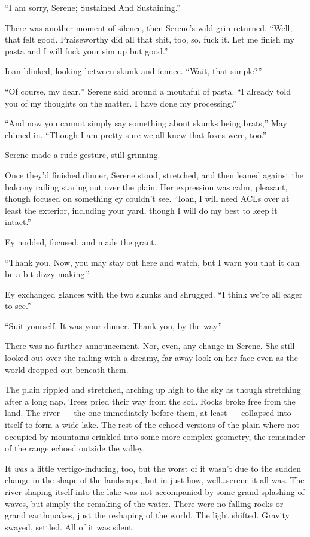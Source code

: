 ``I am sorry, Serene; Sustained And Sustaining.''

There was another moment of silence, then Serene's wild grin returned. ``Well, that felt good. Praiseworthy did all that shit, too, so, fuck it. Let me finish my pasta and I will fuck your sim up but good.''

Ioan blinked, looking between skunk and fennec. ``Wait, that simple?''

``Of course, my dear,'' Serene said around a mouthful of pasta. ``I already told you of my thoughts on the matter. I have done my processing.''

``And now you cannot simply say something about skunks being brats,'' May chimed in. ``Though I am pretty sure we all knew that foxes were, too.''

Serene made a rude gesture, still grinning.

Once they'd finished dinner, Serene stood, stretched, and then leaned against the balcony railing staring out over the plain. Her expression was calm, pleasant, though focused on something ey couldn't see. ``Ioan, I will need ACLs over at least the exterior, including your yard, though I will do my best to keep it intact.''

Ey nodded, focused, and made the grant.

``Thank you. Now, you may stay out here and watch, but I warn you that it can be a bit dizzy-making.''

Ey exchanged glances with the two skunks and shrugged. ``I think we're all eager to see.''

``Suit yourself. It was your dinner. Thank you, by the way.''

There was no further announcement. Nor, even, any change in Serene. She still looked out over the railing with a dreamy, far away look on her face even as the world dropped out beneath them.

The plain rippled and stretched, arching up high to the sky as though stretching after a long nap. Trees pried their way from the soil. Rocks broke free from the land. The river — the one immediately before them, at least — collapsed into itself to form a wide lake. The rest of the echoed versions of the plain where not occupied by mountains crinkled into some more complex geometry, the remainder of the range echoed outside the valley.

It \emph{was} a little vertigo-inducing, too, but the worst of it wasn't due to the sudden change in the shape of the landscape, but in just how, well\ldots serene it all was. The river shaping itself into the lake was not accompanied by some grand splashing of waves, but simply the remaking of the water. There were no falling rocks or grand earthquakes, just the reshaping of the world. The light shifted. Gravity swayed, settled. All of it was silent.

